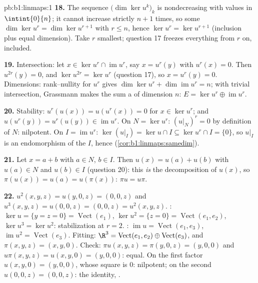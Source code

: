 \begin{solution}{pb:b1:linmaps:1}
\textbf{18.} The sequence $\bigl(\dim\ker u^k\bigr)_k$ is
nondecreasing with values in $\intint{0}{n}$; it cannot increase
strictly $n + 1$ times, so some $\dim\ker u^{r} = \dim\ker
u^{r+1}$ with $r \leq n$, hence $\ker u^{r} = \ker u^{r+1}$
(inclusion plus equal dimension). Take $r$ smallest; question 17
freezes everything from $r$ on,  included.

\textbf{19.} Intersection: let $x \in \ker u^{r} \cap
\operatorname{im} u^{r}$, say $x = u^{r}(y)$ with $u^{r}(x) =
0$. Then $u^{2r}(y) = 0$, and $\ker u^{2r} = \ker u^{r}$
(question 17), so $x = u^{r}(y) = 0$. Dimensions: rank--nullity
for $u^{r}$ gives $\dim\ker u^{r} + \dim\operatorname{im} u^{r}
= n$; with trivial intersection, Grassmann makes the sum a
 of dimension $n$: $E = \ker u^{r} \oplus
\operatorname{im} u^{r}$.

\textbf{20.} Stability: $u^{r}(u(x)) = u(u^{r}(x)) = 0$ for $x
\in \ker u^{r}$; and $u(u^{r}(y)) = u^{r}(u(y)) \in
\operatorname{im} u^{r}$. On $N = \ker u^{r}$: $(u|_N)^{r} = 0$
by definition of $N$: nilpotent. On $I = \operatorname{im}
u^{r}$: $\ker(u|_I) = \ker u \cap I \subseteq \ker u^{r} \cap I
= \{0\}$, so $u|_I$ is an  endomorphism of the
 $I$, hence 
(\cref{cor:b1:linmaps:samedim}).

\textbf{21.} Let $x = a + b$ with $a \in N$, $b \in I$. Then
$u(x) = u(a) + u(b)$ with $u(a) \in N$ and $u(b) \in I$
(question 20): this \emph{is} the decomposition of $u(x)$, so
$\pi(u(x)) = u(a) = u(\pi(x))$: $\pi u = u\pi$.

\textbf{22.} $u^2(x,y,z) = u(y, 0, z) = (0, 0, z)$ and
$u^3(x,y,z) = u(0,0,z) = (0,0,z) = u^2(x,y,z)$. : $\ker u
= \{y = z = 0\} = \operatorname{Vect}(e_1)$, $\ker u^2 = \{z =
0\} = \operatorname{Vect}(e_1, e_2)$, $\ker u^3 = \ker u^2$:
stabilization at $r = 2$. : $\operatorname{im} u =
\operatorname{Vect}(e_1, e_3)$, $\operatorname{im} u^2 =
\operatorname{Vect}(e_3)$. Fitting: $\R^3 =
\operatorname{Vect}(e_1, e_2) \oplus \operatorname{Vect}(e_3)$,
and $\pi(x, y, z) = (x, y, 0)$. Check: $\pi u(x,y,z) = \pi(y, 0,
z) = (y, 0, 0)$ and $u\pi(x,y,z) = u(x, y, 0) = (y, 0, 0)$:
equal. On the first factor $u(x, y, 0) = (y, 0, 0)$, whose
square is $0$: nilpotent; on the second $u(0,0,z) = (0,0,z)$:
the identity, .


\end{solution}
